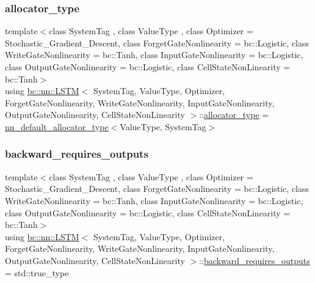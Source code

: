 \subsubsection{\texorpdfstring{allocator\+\_\+type}{allocator\_type}}
{\footnotesize\ttfamily template$<$class System\+Tag , class Value\+Type , class Optimizer  = Stochastic\+\_\+\+Gradient\+\_\+\+Descent, class Forget\+Gate\+Nonlinearity  = bc\+::\+Logistic, class Write\+Gate\+Nonlinearity  = bc\+::\+Tanh, class Input\+Gate\+Nonlinearity  = bc\+::\+Logistic, class Output\+Gate\+Nonlinearity  = bc\+::\+Logistic, class Cell\+State\+Non\+Linearity  = bc\+::\+Tanh$>$ \\
using \hyperlink{structbc_1_1nn_1_1LSTM}{bc\+::nn\+::\+L\+S\+TM}$<$ System\+Tag, Value\+Type, Optimizer, Forget\+Gate\+Nonlinearity, Write\+Gate\+Nonlinearity, Input\+Gate\+Nonlinearity, Output\+Gate\+Nonlinearity, Cell\+State\+Non\+Linearity $>$\+::\hyperlink{structbc_1_1nn_1_1LSTM_a860169e34fe01e7c9faef6186353f856}{allocator\+\_\+type} =  \hyperlink{namespacebc_1_1nn_a0025752fc3f47f988b3fae106c825860}{nn\+\_\+default\+\_\+allocator\+\_\+type}$<$Value\+Type, System\+Tag$>$}

\mbox{\label{structbc_1_1nn_1_1LSTM_aeb7cbe9394df31133663bd53c98650b7}} 
\subsubsection{\texorpdfstring{backward\+\_\+requires\+\_\+outputs}{backward\_requires\_outputs}}
{\footnotesize\ttfamily template$<$class System\+Tag , class Value\+Type , class Optimizer  = Stochastic\+\_\+\+Gradient\+\_\+\+Descent, class Forget\+Gate\+Nonlinearity  = bc\+::\+Logistic, class Write\+Gate\+Nonlinearity  = bc\+::\+Tanh, class Input\+Gate\+Nonlinearity  = bc\+::\+Logistic, class Output\+Gate\+Nonlinearity  = bc\+::\+Logistic, class Cell\+State\+Non\+Linearity  = bc\+::\+Tanh$>$ \\
using \hyperlink{structbc_1_1nn_1_1LSTM}{bc\+::nn\+::\+L\+S\+TM}$<$ System\+Tag, Value\+Type, Optimizer, Forget\+Gate\+Nonlinearity, Write\+Gate\+Nonlinearity, Input\+Gate\+Nonlinearity, Output\+Gate\+Nonlinearity, Cell\+State\+Non\+Linearity $>$\+::\hyperlink{structbc_1_1nn_1_1LSTM_aeb7cbe9394df31133663bd53c98650b7}{backward\+\_\+requires\+\_\+outputs} =  std\+::true\+\_\+type}

